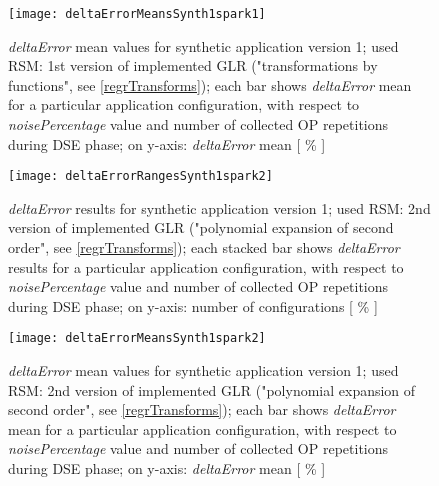 \begin{figure}[H]

    \centering
    
    \texttt{[image: deltaErrorMeansSynth1spark1]}
    
    \caption{\textit{deltaError} mean values for synthetic application version 1; used RSM: 1st version of implemented GLR ("transformations by functions", see \ref{regrTransforms}); each bar shows \textit{deltaError} mean for a particular application configuration, with respect to \textit{noisePercentage} value and number of collected OP repetitions during DSE phase; on y-axis: \textit{deltaError} mean [ \% ]}
    
    \label{fig::synth1spark1::means}
    
\end{figure}





\begin{figure}[H]

    \centering
    
    \texttt{[image: deltaErrorRangesSynth1spark2]}
    
     \caption{\textit{deltaError} results for synthetic application version 1; used RSM: 2nd version of implemented GLR ("polynomial expansion of second order", see \ref{regrTransforms}); each stacked bar shows \textit{deltaError} results for a particular application configuration, with respect to \textit{noisePercentage} value and number of collected OP repetitions during DSE phase; on y-axis: number of configurations [ \% ]}
    
    \label{fig::synth1spark2::intervals}
    
\end{figure}

\begin{figure}[H]

    \centering
    
    \texttt{[image: deltaErrorMeansSynth1spark2]}
    
    \caption{\textit{deltaError} mean values for synthetic application version 1; used RSM: 2nd version of implemented GLR ("polynomial expansion of second order", see \ref{regrTransforms}); each bar shows \textit{deltaError} mean for a particular application configuration, with respect to \textit{noisePercentage} value and number of collected OP repetitions during DSE phase; on y-axis: \textit{deltaError} mean [ \% ]}
    
    \label{fig::synth1spark2::means}
    
\end{figure}





